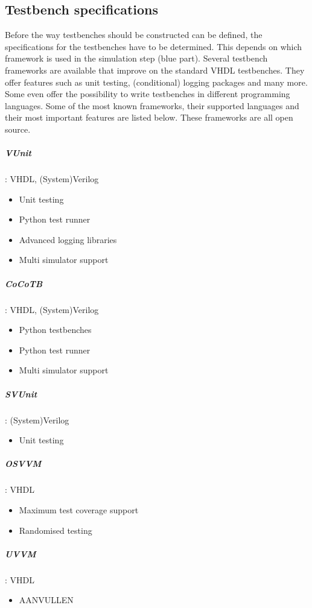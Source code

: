 \subsection{Testbench specifications}
Before the way testbenches should be constructed can be defined, the specifications for the testbenches have to be determined. This depends on which framework is used in the simulation step (blue part). Several testbench frameworks are available that improve on the standard VHDL testbenches. They offer features such as unit testing, (conditional) logging packages and many more. Some even offer the possibility to write testbenches in different programming languages.
\npar
Some of the most known frameworks, their supported languages and their most important features are listed below. These frameworks are all open source.
\subparagraph{VUnit}: VHDL, (System)Verilog
\begin{itemize}
	\item Unit testing
	\item Python test runner
	\item Advanced logging libraries
	\item Multi simulator support
\end{itemize}
\subparagraph{CoCoTB}: VHDL, (System)Verilog
\begin{itemize}
	\item Python testbenches
	\item Python test runner
	\item Multi simulator support	
\end{itemize}
\subparagraph{SVUnit}\cite{svunit}: (System)Verilog
\begin{itemize}
	\item Unit testing
\end{itemize}
\subparagraph{OSVVM}\cite{osvvm}: VHDL
\begin{itemize}
	\item Maximum test coverage support
	\item Randomised testing
\end{itemize}
\subparagraph{UVVM}\cite{uvvm}: VHDL
\begin{itemize}
	\item AANVULLEN
\end{itemize}


